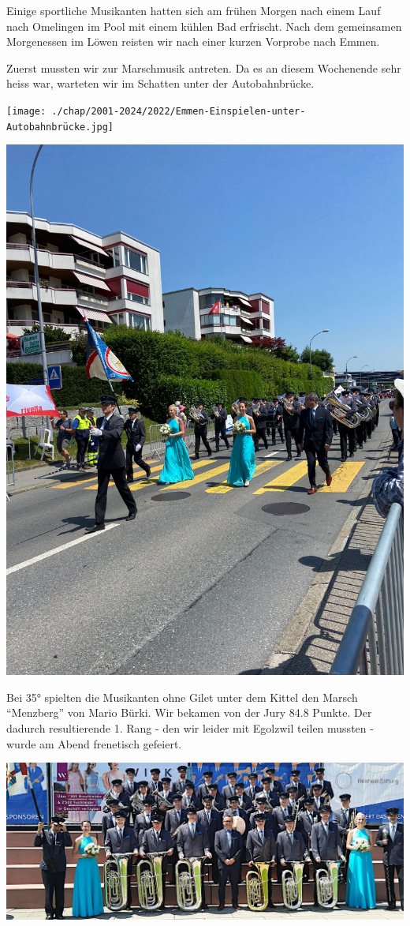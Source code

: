 \begin{history}

    Einige sportliche Musikanten hatten sich am frühen Morgen nach einem Lauf
    nach Omelingen im Pool mit einem kühlen Bad erfrischt. Nach dem gemeinsamen
    Morgenessen im Löwen reisten wir nach einer kurzen Vorprobe nach Emmen.

    Zuerst mussten wir zur Marschmusik antreten. Da es an diesem Wochenende sehr
    heiss war, warteten wir im Schatten unter der Autobahnbrücke.

    \begin{MulticolFigure}
        \centering
        \texttt{[image: ./chap/2001-2024/2022/Emmen-Einspielen-unter-Autobahnbrücke.jpg]}
    \end{MulticolFigure}

    \begin{MulticolFigure}
        \centering
        \includegraphics[width=0.6\linewidth]{./chap/2001-2024/2022/Emmen-Marschmusik.jpg}
    \end{MulticolFigure}

    Bei 35° spielten die Musikanten ohne Gilet unter dem Kittel den Marsch
    \enquote{Menzberg} von Mario Bürki. Wir bekamen von der Jury 84.8 Punkte.
    Der dadurch resultierende 1. Rang - den wir leider mit Egolzwil teilen
    mussten - wurde am Abend frenetisch gefeiert.

    \begin{MulticolFigure}
        \centering
        \includegraphics[width=0.93\linewidth]{./chap/2001-2024/2022/Emmen-Gesamtfoto.jpg}
    \end{MulticolFigure}


\end{history}
